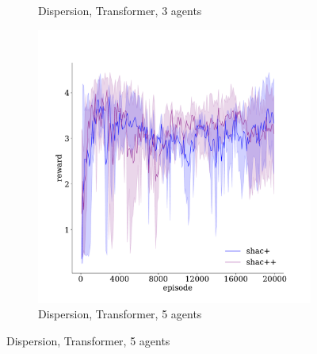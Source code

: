 \begin{figure}[!t]
\begin{subfigure}[b]{0.32\textwidth}
        \caption{Dispersion, Transformer, 3 agents}
        \label{fig:dispersion-ablation-transformer-3}
    \end{subfigure}
    \begin{subfigure}[b]{0.32\textwidth}
        \includegraphics[width=\textwidth]{figs/dispersion-ablation-5-transformer.pdf}
        \caption{Dispersion, Transformer, 5 agents}
        \label{fig:dispersion-ablation-transformer-5}
    \end{subfigure}


\end{figure}
